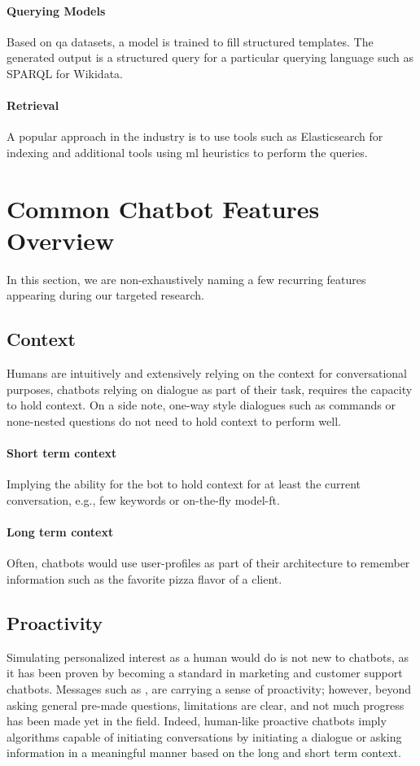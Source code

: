 \paragraph{Querying Models} Based on \gls{qa} datasets, a model is trained to fill structured templates.  The generated output is a structured query for a particular querying language such as SPARQL for Wikidata. 

\paragraph{Retrieval} A popular approach in the industry is to use tools such as Elasticsearch for indexing and additional tools using \gls{ml} heuristics to perform the queries.

\clearpage
\section{Common Chatbot Features Overview}
In this section, we are non-exhaustively naming a few recurring features appearing during our targeted research.

\subsection{Context}
Humans are intuitively and extensively relying on the context for conversational purposes, chatbots relying on dialogue as part of their task, requires the capacity to hold context. On a side note, one-way style dialogues such as commands or none-nested questions do not need to hold context to perform well.

\paragraph{Short term context} Implying the ability for the bot to hold context for at least the current conversation, e.g., few keywords or on-the-fly \gls{model-ft}.

\paragraph{Long term context} Often, chatbots would use user-profiles as part of their architecture to remember information such as the favorite pizza flavor of a client. 

\subsection{Proactivity}
Simulating personalized interest as a human would do is not new to chatbots, as it has been proven by becoming a standard in marketing and customer support chatbots. Messages such as , are carrying a sense of proactivity; however, beyond asking general pre-made questions, limitations are clear, and not much progress has been made yet in the field. Indeed, human-like proactive chatbots imply algorithms capable of initiating conversations by initiating a dialogue or asking information in a meaningful manner based on the long and short term context.

